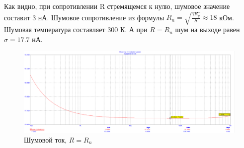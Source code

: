 \documentclass[a4paper, 12pt]{article}%
\begin{document}
\begin{enumerate}
Как видно, при сопротивлении R стремящемся к нулю, шумовое значение составит 3 нА. Шумовое сопротивление из формулы $R_n = \sqrt{\frac{\gamma R_g}{S}} \approx 18$ кОм. Шумовая температура составляет 300 К. А при $R = R_n$ шум на выходе равен $\sigma = 17.7$ нА.

\begin{figure}[h!]
    \centering
    \includegraphics[scale=0.225]{images/2023-11-23_20-35-00.png}
    \caption{Шумовой ток, $R = R_n$}
    \label{fig:m612}
\end{figure}

\FloatBarrier

\end{enumerate}
\end{document}
